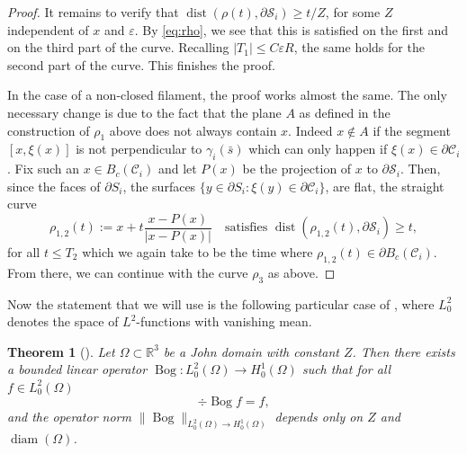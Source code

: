\documentclass[JEP,XML,SOM,Unicode, NoEqCountersInSection,NoFloatCountersInSection,published]{cedram}
\newcommand{\R}{\mathbb{R}}
\let\eps\varepsilon
\DeclareMathOperator{\Bog}{Bog}
\DeclareMathOperator{\diam}{diam}
\DeclareMathOperator{\dist}{dist}
\newtheorem{thm}{Theorem}[section]
\theoremstyle{definition}
\theoremstyle{remark}
\begin{document}
\begin{proof}
It remains to verify that $ \dist(\rho(t),\partial \mathcal S_i) \geq t/Z$, for some $Z$ independent of $x$ and $\eps$.
By \eqref{eq:rho}, we see that this is satisfied on the first and on the third part of the curve. Recalling $|T_1| \leq C \eps R$, the same holds for the second part of the curve. This finishes the proof.

In the case of a non-closed filament, the proof works almost the same. The only necessary change is due to the fact that the plane $A$ as defined in the construction of $\rho_1$ above does not always contain $x$. Indeed $x \not \in A$ if the segment $[x,\xi(x)]$ is not perpendicular to $\gamma_i (\bar s)$ which can only happen if $\xi (x) \in \partial \mathcal C_i$. Fix such an $x \in B_c(\mathcal C_i)$ and let $P(x)$ be the projection of $x$ to $\partial \mathcal S_i$. Then, since the faces of $\partial S_i$, \ie the surfaces $\{y \in \partial S_i : \xi(y) \in \partial \mathcal C_i\}$, are flat, the straight curve
\begin{equation}
\rho_{1,2}(t):= x + t \frac{x - P(x)}{|x - P(x)|}
\quad\text{satisfies }
\dist(\rho_{1,2}(t), \partial \mathcal S_i) \geq t,
\end{equation}
for all $t \leq T_2$ which we again take to be the time where $\rho_{1,2}(t) \in \partial B_c(\mathcal C_i)$. From there, we can continue with the curve $\rho_3$ as above.
\end{proof}

Now the statement that we will use is the following particular case of {\cite[Th.\,4.1]{AcostaDuranMuschietti06}}, where
$L^2_0$ denotes the space of $L^2$-functions with vanishing mean.
\begin{thm}[{\cite[Th.\,4.1]{AcostaDuranMuschietti06}}] \label{John}
Let $\Omega \subset \R^3$ be a John domain with constant $Z$. Then there exists a bounded linear operator
$\Bog \colon L^2_0(\Omega)\!\to\!H^{1}_0(\Omega)$
such that for all \hbox{$f \!\in\!L^2_0(\Omega)$}%
\begin{equation}
\div \Bog f = f,
\end{equation}
and the operator norm
$\|\Bog\|_{L^2_0(\Omega) \to H^{1}_0(\Omega)}$ depends only on $Z$ and $\diam(\Omega)$.
\end{thm}
\end{document}
